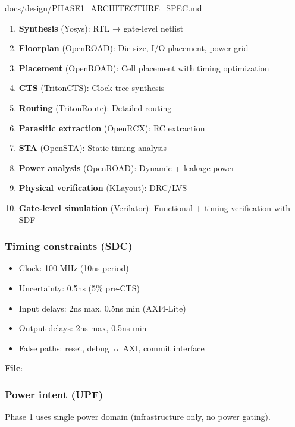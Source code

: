 \begin{relocated}{docs/design/PHASE1_ARCHITECTURE_SPEC.md}
\begin{enumerate}
\def\labelenumi{\arabic{enumi}.}
\tightlist
\item
  \textbf{Synthesis} (Yosys): RTL → gate-level netlist
\item
  \textbf{Floorplan} (OpenROAD): Die size, I/O placement, power grid
\item
  \textbf{Placement} (OpenROAD): Cell placement with timing optimization
\item
  \textbf{CTS} (TritonCTS): Clock tree synthesis
\item
  \textbf{Routing} (TritonRoute): Detailed routing
\item
  \textbf{Parasitic extraction} (OpenRCX): RC extraction
\item
  \textbf{STA} (OpenSTA): Static timing analysis
\item
  \textbf{Power analysis} (OpenROAD): Dynamic + leakage power
\item
  \textbf{Physical verification} (KLayout): DRC/LVS
\item
  \textbf{Gate-level simulation} (Verilator): Functional + timing
  verification with SDF
\end{enumerate}

\subsubsection{Timing constraints (SDC)}\label{ds:ch:phase1-architecture:timing-constraints-sdc}

\begin{itemize}
\tightlist
\item
  Clock: 100 MHz (10ns period)
\item
  Uncertainty: 0.5ns (5\% pre-CTS)
\item
  Input delays: 2ns max, 0.5ns min (AXI4-Lite)
\item
  Output delays: 2ns max, 0.5ns min
\item
  False paths: reset, debug ↔ AXI, commit interface
\end{itemize}

\textbf{File}: 

\subsubsection{Power intent (UPF)}\label{ds:ch:phase1-architecture:power-intent-upf}

Phase 1 uses single power domain (infrastructure only, no power gating).


\end{relocated}
